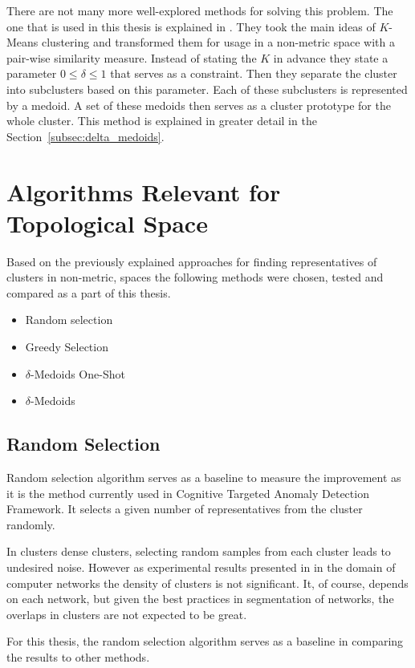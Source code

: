 \documentclass[thesis=B,english]{FITthesis}[2012/10/20]
\begin{document}
There are not many more well-explored methods for solving this problem.
The one that is used in this thesis is explained in \cite{liebman2015representative}.
They took the main ideas of $K$-Means clustering and transformed them for usage in a non-metric space with a pair-wise similarity measure.
Instead of stating the $K$ in advance they state a parameter  $ 0 \leq \delta \leq 1$ that serves as a constraint.
Then they separate the cluster into subclusters based on this parameter.
Each of these subclusters is represented by a medoid.
A set of these medoids then serves as a cluster prototype for the whole cluster.
This method is explained in greater detail in the Section~\ref{subsec:delta_medoids}.

\section{Algorithms Relevant for Topological Space}\label{sec:relevant_methods}
Based on the previously explained approaches for finding representatives of clusters in non-metric, spaces the following methods were chosen, tested and compared as a part of this thesis.
\begin{itemize}
    \item Random selection
    \item Greedy Selection
    \item $\delta$-Medoids One-Shot
    \item $\delta$-Medoids
\end{itemize}

\subsection{Random Selection}\label{subsec:random_select}

Random selection algorithm serves as a baseline to measure the improvement as it is the method currently used in Cognitive Targeted Anomaly Detection Framework.
It selects a given number of representatives from the cluster randomly.

In clusters dense clusters, selecting random samples from each cluster leads to undesired noise.
However as experimental results presented in \cite{kopp2018community} in the domain of computer networks the density of clusters is not significant.
It, of course, depends on each network, but given the best practices in segmentation of networks, the overlaps in clusters are not expected to be great.

For this thesis, the random selection algorithm serves as a baseline in comparing the results to other methods.
\end{document}
